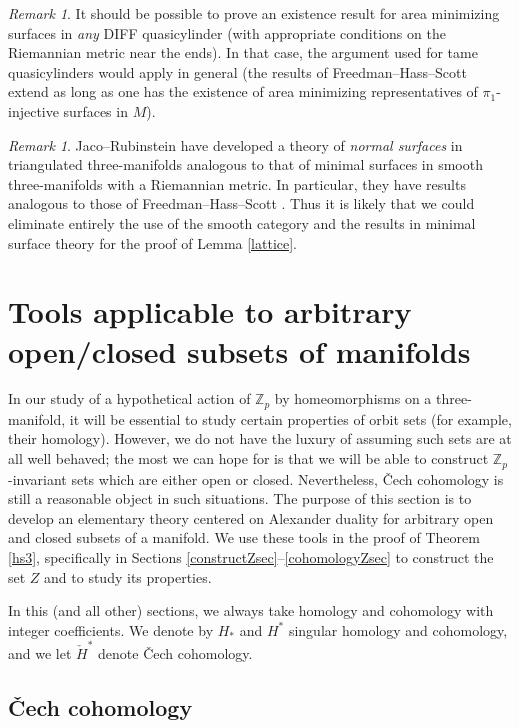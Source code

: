 \documentclass[12pt]{article}
\theoremstyle{plain}
\theoremstyle{definition}
\theoremstyle{remark}
\newtheorem{remark}[theorem]{Remark}
\numberwithin{equation}{section}
\begin{document}
\begin{remark}
It should be possible to prove an existence result for area minimizing surfaces in \emph{any} DIFF quasicylinder (with appropriate conditions on the Riemannian metric near the ends).  In that case, the argument used for tame quasicylinders would apply in general (the results of Freedman--Hass--Scott \cite{freedman} extend as long as one has the existence of area minimizing representatives of $\pi_1$-injective surfaces in $M$).
\end{remark}

\begin{remark}
Jaco--Rubinstein \cite{jacorubinstein} have developed a theory of \emph{normal surfaces} in triangulated three-manifolds analogous to that of minimal surfaces in smooth three-manifolds with a Riemannian metric.  In particular, they have results analogous to those of Freedman--Hass--Scott \cite{freedman}.  Thus it is likely that we could eliminate entirely the use of the smooth category and the results in minimal surface theory for the proof of Lemma \ref{lattice}.
\end{remark}

\section{Tools applicable to arbitrary open/closed subsets of manifolds}\label{toolssec}

In our study of a hypothetical action of $\mathbb Z_p$ by homeomorphisms on a three-manifold, it will be essential to study certain properties of orbit sets (for example, their homology).  However, we do not have the luxury of assuming such sets are at all well behaved; the most we can hope for is that we will be able to construct $\mathbb Z_p$-invariant sets which are either open or closed.  Nevertheless, \v Cech cohomology is still a reasonable object in such situations.  The purpose of this section is to develop an elementary theory centered on Alexander duality for arbitrary open and closed subsets of a manifold.  We use these tools in the proof of Theorem \ref{hs3}, specifically in Sections \ref{constructZsec}--\ref{cohomologyZsec} to construct the set $Z$ and to study its properties.

In this (and all other) sections, we always take homology and cohomology with integer coefficients.  We denote by $H_\ast$ and $H^\ast$ singular homology and cohomology, and we let $\check H^\ast$ denote \v Cech cohomology.

\subsection{\v Cech cohomology}
\end{document}
